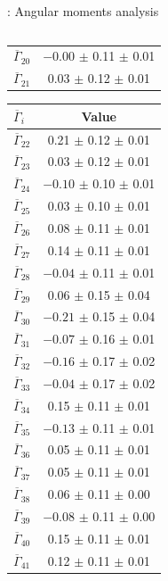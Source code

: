 \documentclass[aspectratio=1610]{beamer}
\begin{document}
\begin{frame}{\BdToKpimm: Angular moments analysis}
\begin{columns}
\begin{column}{0.6\textwidth}
{\begin{tabular}{l|c}
$\overline{\Gamma}_{20}$ & $-0.00$ $\pm$ 0.11 $\pm$ 0.01 \\ 
$\overline{\Gamma}_{21}$ & \hphantom{$-$}0.03 $\pm$ 0.12 $\pm$ 0.01 \\ 
\end{tabular}
\hspace{1em}
\begin{tabular}{l|c}
$\overline{\Gamma}_{i}$ & Value \\ 
\hline
$\overline{\Gamma}_{22}$ & \hphantom{$-$}0.21 $\pm$ 0.12 $\pm$ 0.01 \\ 
$\overline{\Gamma}_{23}$ & \hphantom{$-$}0.03 $\pm$ 0.12 $\pm$ 0.01 \\ 
$\overline{\Gamma}_{24}$ & $-0.10$ $\pm$ 0.10 $\pm$ 0.01 \\ 
$\overline{\Gamma}_{25}$ & \hphantom{$-$}0.03 $\pm$ 0.10 $\pm$ 0.01 \\ 
$\overline{\Gamma}_{26}$ & \hphantom{$-$}0.08 $\pm$ 0.11 $\pm$ 0.01 \\ 
$\overline{\Gamma}_{27}$ & \hphantom{$-$}0.14 $\pm$ 0.11 $\pm$ 0.01 \\ 
$\overline{\Gamma}_{28}$ & $-0.04$ $\pm$ 0.11 $\pm$ 0.01 \\ 
$\overline{\Gamma}_{29}$ & \hphantom{$-$}0.06 $\pm$ 0.15 $\pm$ 0.04 \\ 
$\overline{\Gamma}_{30}$ & $-0.21$ $\pm$ 0.15 $\pm$ 0.04 \\ 
$\overline{\Gamma}_{31}$ & $-0.07$ $\pm$ 0.16 $\pm$ 0.01 \\ 
$\overline{\Gamma}_{32}$ & $-0.16$ $\pm$ 0.17 $\pm$ 0.02 \\ 
$\overline{\Gamma}_{33}$ & $-0.04$ $\pm$ 0.17 $\pm$ 0.02 \\ 
$\overline{\Gamma}_{34}$ & \hphantom{$-$}0.15 $\pm$ 0.11 $\pm$ 0.01 \\ 
$\overline{\Gamma}_{35}$ & $-0.13$ $\pm$ 0.11 $\pm$ 0.01 \\ 
$\overline{\Gamma}_{36}$ & \hphantom{$-$}0.05 $\pm$ 0.11 $\pm$ 0.01 \\ 
$\overline{\Gamma}_{37}$ & \hphantom{$-$}0.05 $\pm$ 0.11 $\pm$ 0.01 \\ 
$\overline{\Gamma}_{38}$ & \hphantom{$-$}0.06 $\pm$ 0.11 $\pm$ 0.00 \\ 
$\overline{\Gamma}_{39}$ & $-0.08$ $\pm$ 0.11 $\pm$ 0.00 \\ 
$\overline{\Gamma}_{40}$ & \hphantom{$-$}0.15 $\pm$ 0.11 $\pm$ 0.01 \\ 
$\overline{\Gamma}_{41}$ & \hphantom{$-$}0.12 $\pm$ 0.11 $\pm$ 0.01 \\ 
\end{tabular}
}
\end{column}
\begin{column}{0.2\textwidth}
\end{column}
\end{columns}
\end{frame}
\end{document}
